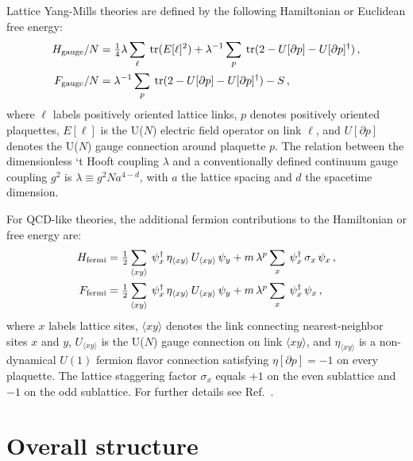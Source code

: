 \documentclass [12pt]{article}
\newcommand{\tr}{\mathop{\mathrm{tr}}}
\begin{document}
Lattice Yang-Mills theories are defined by the following Hamiltonian
or Euclidean free energy:
\begin{subequations}
\begin{align}
	H_{\rm gauge}/N &= \tfrac 14 \lambda \sum_\ell \> \tr (E[\ell]^2)
	    + \lambda^{-1} \sum_p \> \tr (2 - U[\partial p] - U[\partial p]^\dagger) \,,
    \\
	F_{\rm gauge}/N &= \lambda^{-1} \sum_p \> \tr (2 - U[\partial p] - U[\partial p]^\dagger)
	    - S \,,
\end{align}
\end{subequations}
where $\ell$ labels positively oriented lattice links,
$p$ denotes positively oriented plaquettes,
$E[\ell]$ is the U($N$) electric field operator on link $\ell$, and
$U[\partial p]$ denotes the U($N$) gauge connection around plaquette $p$.
The relation between the dimensionless `t Hooft coupling $\lambda$ and a
conventionally defined continuum gauge coupling $g^2$ is
$\lambda \equiv g^2 N a^{4-d}$, with $a$ the lattice spacing and $d$ the spacetime dimension.

For QCD-like theories, the additional
fermion contributions to the Hamiltonian or free energy are:
\begin{subequations}\label{eq:fermidef}
\begin{align}
    H_{\rm fermi} &= \tfrac 12 \sum_{\langle xy \rangle} \>
	\psi^\dagger_x \, \eta_{\langle xy \rangle} \, U_{\langle xy \rangle} \, \psi_y
	+ m \, \lambda^p \sum_x \> \psi^\dagger_x \, \sigma_x \, \psi_x \,,
    \\
    F_{\rm fermi} &= \tfrac 12 \sum_{\langle xy \rangle} \>
	\psi^\dagger_x \, \eta_{\langle xy \rangle} \, U_{\langle xy \rangle} \, \psi_y
	+ m \, \lambda^p \sum_x \> \psi^\dagger_x \, \psi_x \,,
\end{align}
\end{subequations}
where $x$ labels lattice sites,
$\langle xy \rangle$ denotes the link connecting nearest-neighbor sites $x$ and $y$,
$U_{\langle xy \rangle}$ is the U($N$) gauge connection on link $\langle xy \rangle$,
and
$\eta_{\langle xy \rangle}$ is a non-dynamical $U(1)$ fermion flavor connection
satisfying $\eta[\partial p] = -1$ on every plaquette.
The lattice staggering factor
$\sigma_x$ equals $+1$ on the even sublattice and $-1$ on the odd sublattice.
For further details see Ref.~\cite{CSVAII}.

\section {Overall structure}
\end{document}
